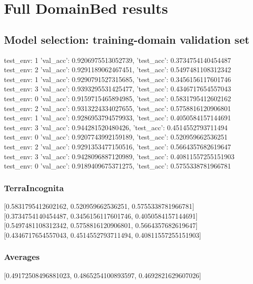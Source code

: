 \documentclass{article}
\begin{document}
\section{Full DomainBed results}

\subsection{Model selection: training-domain validation set}
test_env: 1
{'val_acc': 0.9206975513052739, 'test_acc': 0.3734754140454487}
test_env: 2
{'val_acc': 0.9291189062467451, 'test_acc': 0.5497481108312342}
test_env: 1
{'val_acc': 0.9290791527315685, 'test_acc': 0.3456156117601746}
test_env: 3
{'val_acc': 0.9393295531425477, 'test_acc': 0.4346717654557043}
test_env: 0
{'val_acc': 0.9159715465894985, 'test_acc': 0.5831795412602162}
test_env: 2
{'val_acc': 0.9313224334027655, 'test_acc': 0.5758816120906801}
test_env: 1
{'val_acc': 0.9286953794579933, 'test_acc': 0.4050584157144691}
test_env: 3
{'val_acc': 0.944281520480426, 'test_acc': 0.4514552793711494}
test_env: 0
{'val_acc': 0.9207743992159189, 'test_acc': 0.520959662536251}
test_env: 2
{'val_acc': 0.9291353477150516, 'test_acc': 0.5664357682619647}
test_env: 3
{'val_acc': 0.9428096887120989, 'test_acc': 0.40811557255151903}
test_env: 0
{'val_acc': 0.9189409675371275, 'test_acc': 0.5755338781966781}

\subsubsection{TerraIncognita}
[0.5831795412602162, 0.520959662536251, 0.5755338781966781]
[0.3734754140454487, 0.3456156117601746, 0.4050584157144691]
[0.5497481108312342, 0.5758816120906801, 0.5664357682619647]
[0.4346717654557043, 0.4514552793711494, 0.40811557255151903]

\begin{center}
\end{center}

\subsubsection{Averages}
[0.49172508496881023, 0.4865254100893597, 0.4692821629607026]

\begin{center}
\end{center}
\end{document}
